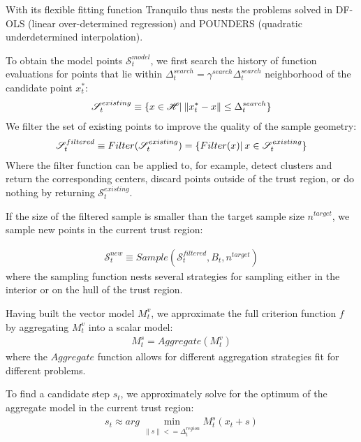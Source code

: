 With its flexible fitting function Tranquilo thus nests the problems solved in DF-OLS (linear over-determined regression) and POUNDERS (quadratic underdetermined interpolation).

To obtain the model points $\mathcal{S}^{model}_t$, we first search the history of function evaluations for points that lie within $\Delta_t^{search}=\gamma^{search}\Delta_t^{search}$ neighborhood of the candidate point $x_t^*$:
\begin{align}
    \mathscr{S}^{existing}_t\equiv\{x\in\mathscr{H}|\hspace{0.2em}\lVert x^*_t-x\rVert\leq\Delta^{search}_t\}
    \label{eq:hist-search}
\end{align}
We filter the set of existing points to improve the quality of the sample geometry:
\begin{align}
    \mathscr{S}^{filtered}_t\equiv Filter (\mathscr{S}^{existing}_t) = \{ Filter (x)|\hspace{0.2em} x\in \mathscr{S}^{existing}_t\}
    \label{eq:filtering}
\end{align}
Where the filter function can be applied to, for example, detect clusters and return the corresponding centers, discard points outside of the trust region, or do nothing by returning $\mathcal{S}_t^{existing}$.

If the size of the filtered sample is smaller than the target sample size $n^{target}$, we sample new points in the current trust region:

\begin{align}
    \mathcal{S}^{new}_{t}\equiv Sample(\mathcal{S}_t^{filtered},B_t,n^{target})
    \label{eq:sample-points}
\end{align}
where the sampling function nests several strategies for sampling either in the interior or on the hull of the trust region.

Having built the vector model $M_t^v$, we approximate the full criterion function $f$ by aggregating $M_t^v$ into a scalar model:
\begin{align}
    M_t^s = Aggregate(M_t^v)
\end{align}
where the $Aggregate$ function allows for different aggregation strategies fit for different problems.

To find a candidate step $s_t$, we approximately solve for the optimum of the aggregate model in the current trust region:
\begin{align}
    s_t\approx arg\,\min\limits_{\lVert s\rVert<=\Delta_t^{region}}M_t^s(x_t+s)
    \label{eq:cand-step}
\end{align}


